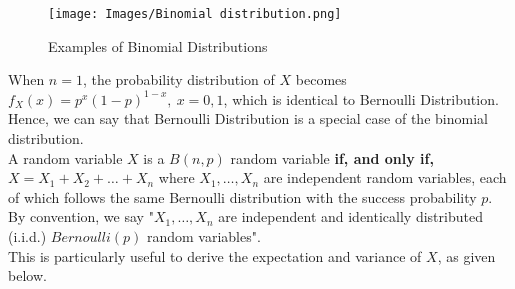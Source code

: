 \begin{figure}[!ht]
    \centering
    \texttt{[image: Images/Binomial distribution.png]}
    \caption{Examples of Binomial Distributions}
    \label{fig:binomial distribution}
\end{figure}

\begin{note}
\end{note}
When $n = 1$, the probability distribution of $X$ becomes $f_X(x) = p^x (1-p)^{1-x},\ x = 0,1$, which is identical to Bernoulli Distribution. Hence, we can say that Bernoulli Distribution is a special case of the binomial distribution. \\
A random variable $X$ is a $B(n,p)$ random variable \textbf{if, and only if,} $X = X_1 + X_2 + \dots + X_n$ where $X_1, \dots , X_n$ are independent random variables, each of which follows the same Bernoulli distribution with the success probability $p$. By convention, we say "$X_1, \dots, X_n$ are independent and identically distributed (i.i.d.) $Bernoulli(p)$ random variables". \\
This is particularly useful to derive the expectation and variance of $X$, as given below.


